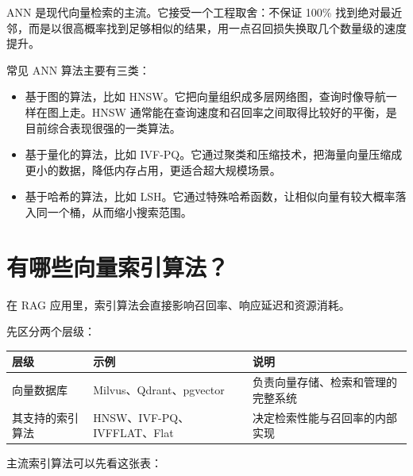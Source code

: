 \documentclass[9pt,a4paper,twocolumn]{ctexart}
\begin{document}
ANN 是现代向量检索的主流。它接受一个工程取舍：不保证 100\% 找到绝对最近邻，而是以很高概率找到足够相似的结果，用一点召回损失换取几个数量级的速度提升。



常见 ANN 算法主要有三类：


\begin{itemize}[itemsep=1pt, topsep=2pt]
  \item 基于图的算法，比如 HNSW。它把向量组织成多层网络图，查询时像导航一样在图上走。HNSW 通常能在查询速度和召回率之间取得比较好的平衡，是目前综合表现很强的一类算法。
  \item 基于量化的算法，比如 IVF-PQ。它通过聚类和压缩技术，把海量向量压缩成更小的数据，降低内存占用，更适合超大规模场景。
  \item 基于哈希的算法，比如 LSH。它通过特殊哈希函数，让相似向量有较大概率落入同一个桶，从而缩小搜索范围。
\end{itemize}


\section*{有哪些向量索引算法？}


在 RAG 应用里，索引算法会直接影响召回率、响应延迟和资源消耗。



先区分两个层级：


{\footnotesize
\begin{tabular}{|p{}|p{}|p{}|}
\hline
\textbf{层级} & \textbf{示例} & \textbf{说明} \\
\hline
向量数据库 & Milvus、Qdrant、pgvector & 负责向量存储、检索和管理的完整系统 \\
\hline
其支持的索引算法 & HNSW、IVF-PQ、IVFFLAT、Flat & 决定检索性能与召回率的内部实现 \\
\hline
\end{tabular}
}



主流索引算法可以先看这张表：
\end{document}
